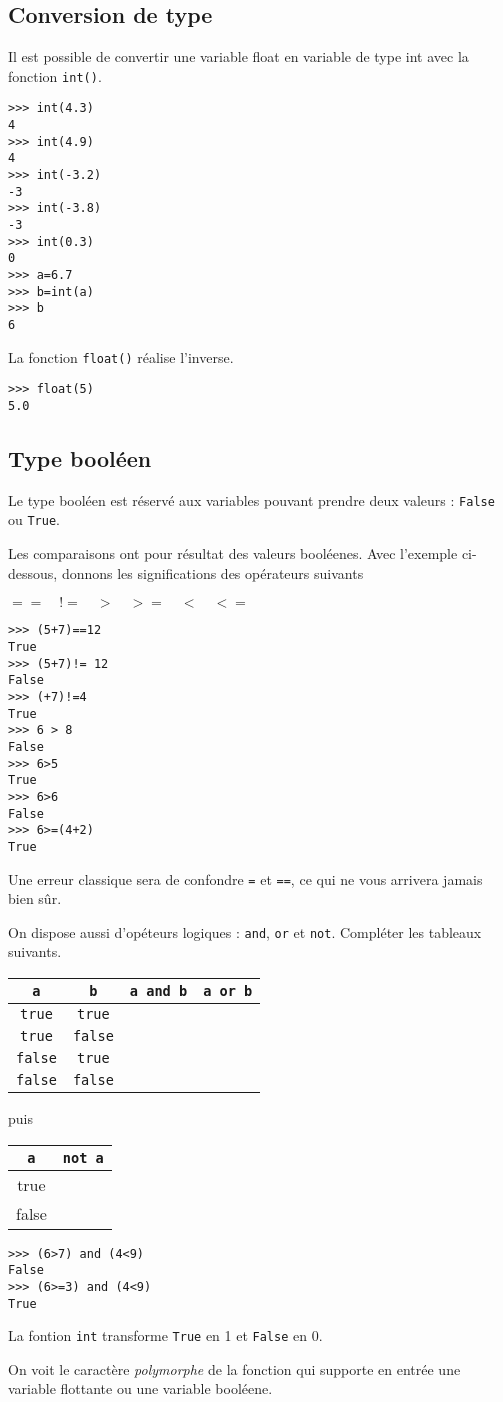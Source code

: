 \subsection{Conversion de type}
Il est possible de convertir une variable float en variable de type int avec la fonction {\tt int()}.
\begin{lstlisting}
>>> int(4.3)
4
>>> int(4.9)
4
>>> int(-3.2)
-3
>>> int(-3.8)
-3
>>> int(0.3)
0
>>> a=6.7
>>> b=int(a)
>>> b
6
\end{lstlisting}
La fonction \lstinline?float()? réalise l'inverse.
\begin{lstlisting}
>>> float(5)
5.0
\end{lstlisting}
\subsection{Type booléen}
Le type booléen est réservé aux variables pouvant prendre deux valeurs : \lstinline?False? ou \lstinline?True?.\par
Les comparaisons ont pour résultat des valeurs booléenes. Avec l'exemple ci-dessous, donnons les significations des opérateurs suivants \par
$==\quad != \quad > \quad >= \quad < \quad <=$
\begin{lstlisting}
>>> (5+7)==12
True
>>> (5+7)!= 12
False
>>> (+7)!=4
True
>>> 6 > 8
False
>>> 6>5
True
>>> 6>6
False
>>> 6>=(4+2)
True
\end{lstlisting}
Une erreur classique sera de confondre \lstinline?=? et \lstinline?==?, ce qui ne vous arrivera jamais bien sûr.\par
On dispose aussi d'opéteurs logiques : \lstinline?and?, \lstinline?or? et \lstinline?not?. Compléter les tableaux suivants.\par
\begin{tabular}{|c|c|c|c|}
\hline
  \lstinline?a?  & \lstinline?b? &  \lstinline?a and b?&  \lstinline?a or b?  \\
\hline
 \texttt{true} & \texttt{true} & &   \\
\hline
 \texttt{true} & \texttt{false} & &   \\
\hline
 \texttt{false} & \texttt{true} & &   \\
\hline
 \texttt{false} & \texttt{false} & &   \\
 \hline 
\end{tabular} 
puis
 \begin{tabular}{|c|c|}
\hline
   \lstinline?a? &  \lstinline?not a?  \\
\hline
 true &   \\
\hline
false &   \\
\hline
\end{tabular}\par
\begin{lstlisting}
>>> (6>7) and (4<9)
False
>>> (6>=3) and (4<9)
True
\end{lstlisting}
La fontion \lstinline?int? transforme \lstinline?True? en 1 et \lstinline?False? en 0.\par
On voit le caractère \emph{polymorphe} de la fonction qui supporte en entrée une variable flottante ou une variable booléene.

